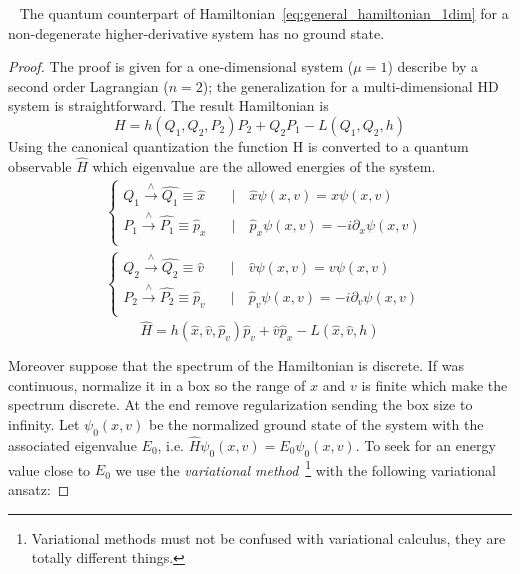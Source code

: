 \begin{theorem}\label{th:ostrogradsky_quantum}~\cite{Smilga17}
  The quantum counterpart of Hamiltonian~\eqref{eq:general_hamiltonian_1dim}
  for a non-degenerate higher-derivative system has no ground state.
\end{theorem}
\begin{proof}
  The proof is given for a one-dimensional system ($\mu=1$) describe by a second
  order Lagrangian ($n=2$); the generalization for a multi-dimensional HD system
  is straightforward. The result Hamiltonian is
  \begin{equation*}
    H = h(Q_1, Q_2, P_2) P_2 + Q_2 P_1 - L(Q_1, Q_2, h)
  \end{equation*}
  Using the canonical quantization the function H is converted to a quantum
  observable $\hat{H}$ which eigenvalue are the allowed energies of the system.
  \begin{align*}
    & \begin{cases}
      Q_1 \xrightarrow{\wedge} \hat{Q_1} \equiv \hat{x}
      \quad &\mid \quad \hat{x}\psi(x, v) = x \psi(x, v) \\
      P_1 \xrightarrow{\wedge} \hat{P_1} \equiv \hat{p}_x
      \quad &\mid \quad \hat{p}_x\psi(x, v) = -i\partial_x \psi(x, v) \\
    \end{cases} \\
    & \begin{cases}
      Q_2 \xrightarrow{\wedge} \hat{Q_2} \equiv \hat{v}
      \quad &\mid \quad \hat{v}\psi(x, v) = v \psi(x, v) \\
      P_2 \xrightarrow{\wedge} \hat{P_2} \equiv \hat{p}_v
      \quad &\mid \quad \hat{p}_v\psi(x, v) = -i\partial_v \psi(x, v) \\
    \end{cases}
  \end{align*}
  \begin{equation} \label{eq:ham_operator_2nd_order}
    \hat{H} = h(\hat{x}, \hat{v}, \hat{p}_v) \hat{p}_v + \hat{v} \hat{p}_x -
    L (\hat{x}, \hat{v}, h)
  \end{equation}

  Moreover suppose that the spectrum of the Hamiltonian is discrete. If was
  continuous, normalize it in a box so the range of $x$ and $v$ is finite which
  make the spectrum discrete. At the end remove regularization sending the box
  size to infinity.
  Let $\psi_0(x, v)$ be the normalized ground state of the system with the
  associated eigenvalue $E_0$, i.e. $\hat{H}\psi_0(x, v) = E_0 \psi_0(x, v)$.
  To seek for an energy value close to $E_0$ we use the \emph{variational
  method}~\footnote{
    Variational methods must not be confused with variational calculus, they
    are totally different things.
  } with the following variational ansatz:


\end{proof}
